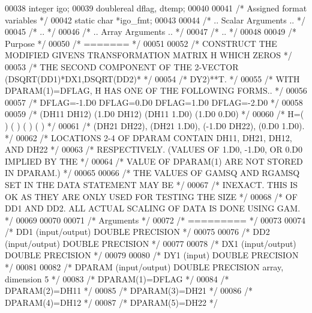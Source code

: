 \begin{DoxyCode}
00038     integer igo;
00039     doublereal dflag, dtemp;
00040 
00041     \textcolor{comment}{/* Assigned format variables */}
00042     \textcolor{keyword}{static} \textcolor{keywordtype}{char} *igo\_fmt;
00043 
00044 \textcolor{comment}{/*     .. Scalar Arguments .. */}
00045 \textcolor{comment}{/*     .. */}
00046 \textcolor{comment}{/*     .. Array Arguments .. */}
00047 \textcolor{comment}{/*     .. */}
00048 
00049 \textcolor{comment}{/*  Purpose */}
00050 \textcolor{comment}{/*  ======= */}
00051 
00052 \textcolor{comment}{/*     CONSTRUCT THE MODIFIED GIVENS TRANSFORMATION MATRIX H WHICH ZEROS */}
00053 \textcolor{comment}{/*     THE SECOND COMPONENT OF THE 2-VECTOR  (DSQRT(DD1)*DX1,DSQRT(DD2)* */}
00054 \textcolor{comment}{/*     DY2)**T. */}
00055 \textcolor{comment}{/*     WITH DPARAM(1)=DFLAG, H HAS ONE OF THE FOLLOWING FORMS.. */}
00056 
00057 \textcolor{comment}{/*     DFLAG=-1.D0     DFLAG=0.D0        DFLAG=1.D0     DFLAG=-2.D0 */}
00058 
00059 \textcolor{comment}{/*       (DH11  DH12)    (1.D0  DH12)    (DH11  1.D0)    (1.D0  0.D0) */}
00060 \textcolor{comment}{/*     H=(          )    (          )    (          )    (          ) */}
00061 \textcolor{comment}{/*       (DH21  DH22),   (DH21  1.D0),   (-1.D0 DH22),   (0.D0  1.D0). */}
00062 \textcolor{comment}{/*     LOCATIONS 2-4 OF DPARAM CONTAIN DH11, DH21, DH12, AND DH22 */}
00063 \textcolor{comment}{/*     RESPECTIVELY. (VALUES OF 1.D0, -1.D0, OR 0.D0 IMPLIED BY THE */}
00064 \textcolor{comment}{/*     VALUE OF DPARAM(1) ARE NOT STORED IN DPARAM.) */}
00065 
00066 \textcolor{comment}{/*     THE VALUES OF GAMSQ AND RGAMSQ SET IN THE DATA STATEMENT MAY BE */}
00067 \textcolor{comment}{/*     INEXACT.  THIS IS OK AS THEY ARE ONLY USED FOR TESTING THE SIZE */}
00068 \textcolor{comment}{/*     OF DD1 AND DD2.  ALL ACTUAL SCALING OF DATA IS DONE USING GAM. */}
00069 
00070 
00071 \textcolor{comment}{/*  Arguments */}
00072 \textcolor{comment}{/*  ========= */}
00073 
00074 \textcolor{comment}{/*  DD1    (input/output) DOUBLE PRECISION */}
00075 
00076 \textcolor{comment}{/*  DD2    (input/output) DOUBLE PRECISION */}
00077 
00078 \textcolor{comment}{/*  DX1    (input/output) DOUBLE PRECISION */}
00079 
00080 \textcolor{comment}{/*  DY1    (input) DOUBLE PRECISION */}
00081 
00082 \textcolor{comment}{/*  DPARAM (input/output)  DOUBLE PRECISION array, dimension 5 */}
00083 \textcolor{comment}{/*     DPARAM(1)=DFLAG */}
00084 \textcolor{comment}{/*     DPARAM(2)=DH11 */}
00085 \textcolor{comment}{/*     DPARAM(3)=DH21 */}
00086 \textcolor{comment}{/*     DPARAM(4)=DH12 */}
00087 \textcolor{comment}{/*     DPARAM(5)=DH22 */}

\end{DoxyCode}
